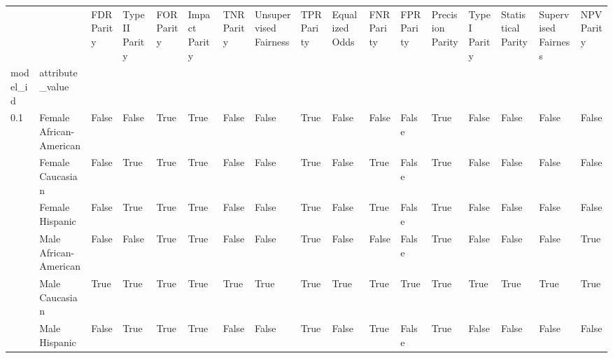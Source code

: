\begin{tabular}{lllllllllllllllll}
\toprule
    &               &  FDR Parity &  TypeII Parity &  FOR Parity &  Impact Parity &  TNR Parity &  Unsupervised Fairness &  TPR Parity &  Equalized Odds &  FNR Parity &  FPR Parity &  Precision Parity &  TypeI Parity &  Statistical Parity &  Supervised Fairness &  NPV Parity \\
model\_id & attribute\_value &             &                &             &                &             &                        &             &                 &             &             &                   &               &                     &                      &             \\
\midrule
0.1 & Female African-American &       False &          False &        True &           True &       False &                  False &        True &           False &       False &       False &              True &         False &               False &                False &       False \\
    & Female Caucasian &       False &           True &        True &           True &       False &                  False &        True &           False &        True &       False &              True &         False &               False &                False &       False \\
    & Female Hispanic &       False &           True &        True &           True &       False &                  False &        True &           False &        True &       False &              True &         False &               False &                False &       False \\
    & Male African-American &       False &          False &        True &           True &       False &                  False &        True &           False &       False &       False &              True &         False &               False &                False &        True \\
    & Male Caucasian &        True &           True &        True &           True &        True &                   True &        True &            True &        True &        True &              True &          True &                True &                 True &        True \\
    & Male Hispanic &       False &           True &        True &           True &       False &                  False &        True &           False &        True &       False &              True &         False &               False &                False &       False \\

\end{tabular}
